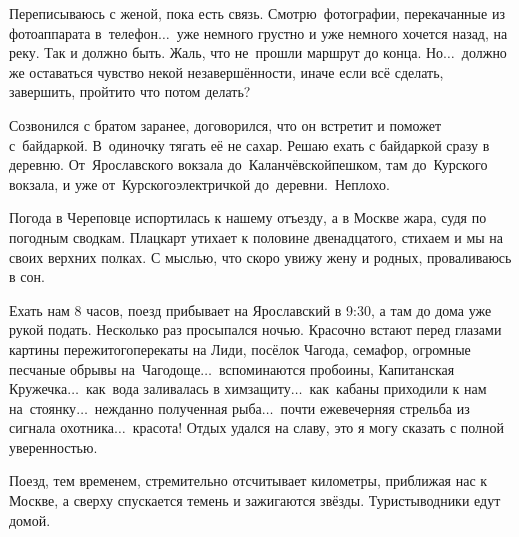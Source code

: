 Переписываюсь с женой, пока есть связь. Смотрю~фотографии, перекачанные из фотоаппарата в~телефон$\ldots$~уже немного грустно и уже немного хочется назад, на реку. Так и должно быть. Жаль, что не~прошли маршрут до конца. Но$\ldots$~должно же оставаться чувство некой незавершённости, иначе если всё сделать, завершить, пройти\mdash то что потом делать? 

Созвонился с братом заранее, договорился, что он встретит и поможет с~байдаркой. В~одиночку тягать её не сахар. Решаю ехать с байдаркой сразу в деревню. От~Ярославского вокзала до~Каланчёвской\mdash пешком, там до~Курского вокзала, и уже от~Курского\mdash электричкой до~деревни.~Неплохо. 

Погода в Череповце испортилась к нашему отъезду, а в Москве жара, судя по погодным сводкам. Плацкарт утихает к половине двенадцатого, стихаем и мы на своих верхних полках. С мыслью, что скоро увижу жену и родных, проваливаюсь в сон. 

Ехать нам 8 часов, поезд прибывает на Ярославский в 9:30, а там до дома уже рукой подать. Несколько раз просыпался ночью. Красочно встают перед глазами картины пережитого\mdash перекаты на Лиди, посёлок Чагода, семафор, огромные песчаные обрывы на~Чагодоще$\ldots$~вспоминаются пробоины, Капитанская Кружечка$\ldots$~как~вода заливалась в химзащиту$\ldots$~как~кабаны приходили к нам на~стоянку$\ldots$~нежданно полученная рыба$\ldots$~почти ежевечерняя стрельба из сигнала охотника$\ldots$~красота! Отдых удался на славу, это я могу сказать с полной уверенностью. 

Поезд, тем временем, стремительно отсчитывает километры, приближая нас к Москве, а сверху спускается темень и зажигаются звёзды. Туристы\sdash водники едут домой.     

\begin{center}
\end{center}